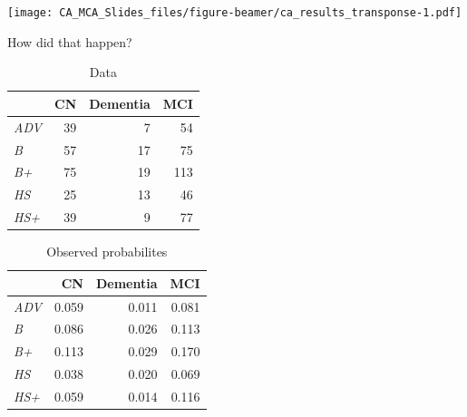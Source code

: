 \documentclass[
  ignorenonframetext,
]{beamer}
\begin{document}
\begin{frame}

\texttt{[image: CA\_MCA\_Slides\_files/figure-beamer/ca\_results\_transponse-1.pdf]}

\end{frame}

\begin{frame}{How did that happen?}
\protect\hypertarget{how-did-that-happen}{}

\begin{table}[t]

\caption{\label{tab:edu_dx_chi2}Data}
\centering
\begin{tabular}{>{\em}lrrr}
\toprule
  & CN & Dementia & MCI\\
\midrule
ADV & 39 & 7 & 54\\
B & 57 & 17 & 75\\
B+ & 75 & 19 & 113\\
HS & 25 & 13 & 46\\
HS+ & 39 & 9 & 77\\
\bottomrule
\end{tabular}
\end{table}

\end{frame}

\begin{frame}

\begin{table}[t]

\caption{\label{tab:edu_dx_chi2_o}Observed probabilites}
\centering
\begin{tabular}{>{\em}lrrr}
\toprule
  & CN & Dementia & MCI\\
\midrule
ADV & 0.059 & 0.011 & 0.081\\
B & 0.086 & 0.026 & 0.113\\
B+ & 0.113 & 0.029 & 0.170\\
HS & 0.038 & 0.020 & 0.069\\
HS+ & 0.059 & 0.014 & 0.116\\
\bottomrule
\end{tabular}
\end{table}

\end{frame}
\end{document}
